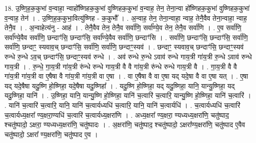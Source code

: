 \documentclass[17pt]{extarticle}
\begin{document}
18. उ॒ष्णि॒ह॒क॒कुभा॑ व॒न्वाहा॒ न्वाहो᳚ष्णिहक॒कुभा॑ वुष्णिहक॒कुभा॑ व॒न्वाह॒ तेन॒ तेना॒न्वा 
हो᳚ष्णिहक॒कुभा॑ वुष्णिहक॒कुभा॑ व॒न्वाह॒ तेन॑ । . उ॒ष्णि॒ह॒क॒कुभा॒वित्यु॑ष्णिह - क॒कुभौ᳚ । . अ॒न्वाह॒ तेन॒ तेना॒न्वाहा॒ न्वाह॒ तेनै॒वैव तेना॒न्वाहा॒ न्वाह॒ तेनै॒व । . अ॒न्वाहेत्य॑नु - आह॑ । . तेनै॒वैव तेन॒ तेनै॒व सर्वा॑णि॒ सर्वा᳚ण्ये॒व तेन॒ तेनै॒व सर्वा॑णि । . ए॒व सर्वा॑णि॒ सर्वा᳚ण्ये॒वैव सर्वा॑णि॒ छन्दाꣳ॑सि॒ छन्दाꣳ॑सि॒ सर्वा᳚ण्ये॒वैव सर्वा॑णि॒ छन्दाꣳ॑सि । . सर्वा॑णि॒ छन्दाꣳ॑सि॒ छन्दाꣳ॑सि॒ सर्वा॑णि॒ सर्वा॑णि॒ छन्दाꣳ॒॒ स्यवाव॒च् छन्दाꣳ॑सि॒ सर्वा॑णि॒ सर्वा॑णि॒ छन्दाꣳ॒॒स्यव॑ । . छन्दाꣳ॒॒ स्यवाव॒च् छन्दाꣳ॑सि॒ छन्दाꣳ॒॒स्यव॑ रुन्धे रु॒न्धे ऽव॒च् छन्दाꣳ॑सि॒ छन्दाꣳ॒॒स्यव॑ रुन्धे । . अव॑ रुन्धे रु॒न्धे ऽवाव॑ रुन्धे गाय॒त्री गा॑य॒त्री रु॒न्धे ऽवाव॑ रुन्धे गाय॒त्री । . रु॒न्धे॒ गा॒य॒त्री गा॑य॒त्री रु॑न्धे रुन्धे गाय॒त्री वै वै गा॑य॒त्री रु॑न्धे रुन्धे गाय॒त्री वै । . गा॒य॒त्री वै वै गा॑य॒त्री गा॑य॒त्री वा ए॒षैषा वै गा॑य॒त्री गा॑य॒त्री वा ए॒षा । . वा ए॒षैषा वै वा ए॒षा यद् यदे॒षा वै वा ए॒षा यत् । . ए॒षा यद् यदे॒षैषा यदु॒ष्णि हो॒ष्णिहा॒ यदे॒षैषा यदु॒ष्णिहा᳚ । . यदु॒ष्णि हो॒ष्णिहा॒ यद् यदु॒ष्णिहा॒ यानि॒ यान्यु॒ष्णिहा॒ यद् यदु॒ष्णिहा॒ यानि॑ । . उ॒ष्णिहा॒ यानि॒ यान्यु॒ष्णि हो॒ष्णिहा॒ यानि॑ च॒त्वारि॑ च॒त्वारि॒ यान्यु॒ष्णि हो॒ष्णिहा॒ यानि॑ च॒त्वारि॑ । . यानि॑ च॒त्वारि॑ च॒त्वारि॒ यानि॒ यानि॑ च॒त्वार्यध्यधि॑ च॒त्वारि॒ यानि॒ यानि॑ च॒त्वार्यधि॑ । . च॒त्वार्यध्यधि॑ च॒त्वारि॑ च॒त्वार्यध्य॒क्षरा᳚ ण्य॒क्षरा॒ण्यधि॑ च॒त्वारि॑ च॒त्वार्यध्य॒क्षरा॑णि । . अध्य॒क्षरा᳚ ण्य॒क्षरा॒ ण्यध्यध्य॒क्षरा॑णि॒ चतु॑ष्पाद॒ श्चतु॑ष्पादो॒ ऽक्षरा॒ ण्यध्यध्य॒क्षरा॑णि॒ चतु॑ष्पादः । . अ॒क्षरा॑णि॒ चतु॑ष्पाद॒ श्चतु॑ष्पादो॒ ऽक्षरा᳚ण्य॒क्षरा॑णि॒ चतु॑ष्पाद ए॒वैव चतु॑ष्पादो॒ ऽक्षरा᳚ ण्य॒क्षरा॑णि॒ चतु॑ष्पाद ए॒व । \newline
\end{document}
